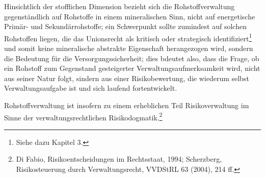 \documentclass[12pt,a4paper,oneside]{book} %
\begin{document}
	Hinsichtlich der stofflichen Dimension bezieht sich die Rohstoffverwaltung gegenständlich auf Rohstoffe in einem mineralischen Sinn, nicht auf energetische Primär- und Sekundärrohstoffe; ein Schwerpunkt sollte zumindest auf solchen Rohstoffen liegen, die das Unionsrecht als kritisch oder strategisch identifiziert\footnote{Siehe dazu Kapitel 3.} und somit keine mineralische abstrakte Eigenschaft herangezogen wird, sondern die Bedeutung für die Versorgungssicherheit; dies bdeutet also, dass die Frage, ob ein Rohstoff zum Gegenstand gesteigerter Verwaltungsaufmerksamkeit wird, nicht aus seiner Natur folgt, sindern aus einer Risikobewertung, die wiederum selbst Verwaltungsaufgabe ist und sich laufend fortentwickelt.
	
	Rohstoffverwaltung ist insofern zu einem erheblichen Teil Risikoverwaltung im Sinne der verwaltungsrechtlichen Risikodogmatik.\footnote{Di Fabio, Risikoentscheidungen im Rechtsstaat, 1994; Scherzberg, Risikosteuerung durch Verwaltungsrecht, VVDStRL 63 (2004), 214 ff.}
	
\end{document}

